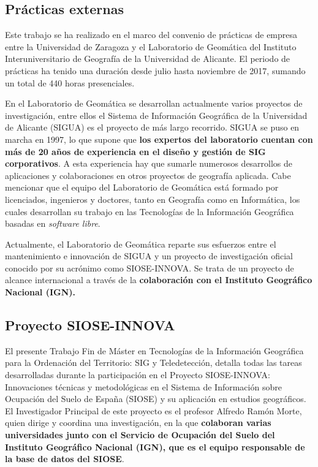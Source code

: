 
\begin{prologo}

\subsection*{Prácticas externas}
Este trabajo se ha realizado en el marco del convenio de prácticas de empresa entre la Universidad de Zaragoza y el Laboratorio de Geomática del Instituto Interuniversitario de Geografía de la Universidad de Alicante. El periodo de prácticas ha tenido una duración desde julio hasta noviembre de 2017, sumando un total de 440 horas presenciales.

En el Laboratorio de Geomática se desarrollan actualmente varios proyectos de investigación, entre ellos el Sistema de Información Geográfica de la Universidad de Alicante (SIGUA) es el proyecto de más largo recorrido. SIGUA se puso en marcha en 1997, lo que supone que \textbf{los expertos del laboratorio cuentan con más de 20 años de experiencia en el diseño y gestión de SIG corporativos}. A esta experiencia hay que sumarle numerosos desarrollos de aplicaciones y colaboraciones en otros proyectos de geografía aplicada. Cabe mencionar que el equipo del Laboratorio de Geomática está formado por licenciados, ingenieros y doctores, tanto en Geografía como en Informática, los cuales desarrollan su trabajo en las Tecnologías de la Información Geográfica basadas en \textit{software libre}.

Actualmente, el Laboratorio de Geomática reparte sus esfuerzos entre el mantenimiento e innovación de SIGUA y un proyecto de investigación oficial conocido por su acrónimo como SIOSE-INNOVA. Se trata de un proyecto de alcance internacional a través de la \textbf{colaboración con el Instituto Geográfico Nacional (IGN).}

\subsection*{Proyecto SIOSE-INNOVA}
El presente Trabajo Fin de Máster en Tecnologías de la Información Geográfica para la Ordenación del Territorio: SIG y Teledetección, detalla todas las tareas desarrolladas durante la participación en el Proyecto SIOSE-INNOVA: Innovaciones técnicas y metodológicas en el Sistema de Información sobre Ocupación del Suelo de España (SIOSE) y su aplicación en estudios geográficos. El Investigador Principal de este proyecto es el profesor Alfredo Ramón Morte, quien dirige y coordina una investigación, en la que \textbf{colaboran varias universidades junto con el  Servicio de Ocupación del Suelo del Instituto Geográfico Nacional (IGN), que es el equipo responsable de la base de datos del SIOSE}.


\end{prologo}
